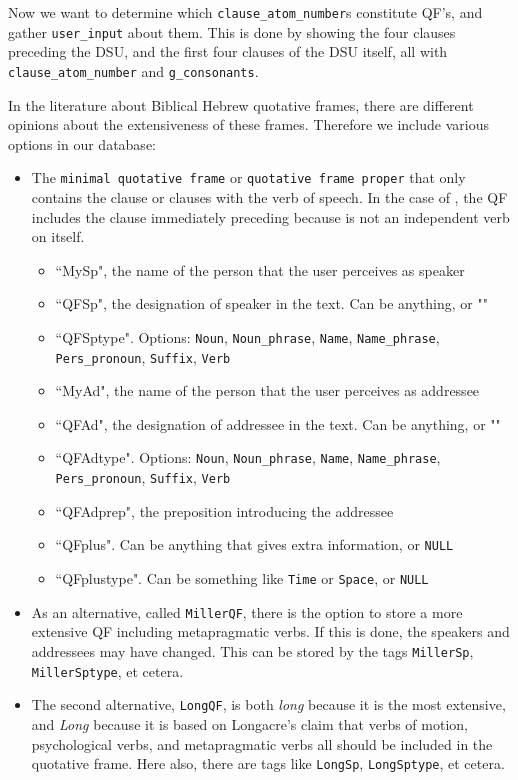 \documentclass{report}
\newcommand{\mi}[1]{\lstinline{#1}}
\begin{document}
\begin{multicols}{2}
Now we want to determine which \mi{clause_atom_number}s constitute QF's, and gather \mi{user_input} about them. This is done by showing the four clauses preceding the DSU, and the first four clauses of the DSU itself, all with \mi{clause_atom_number} and \mi{g_consonants}.

In the literature about Biblical Hebrew quotative frames, there are different opinions about the extensiveness of these frames. Therefore we include various options in our database:

\begin{itemize}
    \item The \mi{minimal quotative frame} or \mi{quotative frame proper} that only contains the clause or clauses with the verb of speech. In the case of , the QF includes the clause immediately preceding  because  is not an independent verb on itself.
    \begin{itemize}
        \item ``MySp", the name of the person that the user perceives as speaker 
        \item ``QFSp", the designation of speaker in the text. Can be anything, or ""
        \item ``QFSptype". Options: \mi{Noun}, \mi{Noun_phrase}, \mi{Name}, \mi{Name_phrase}, \mi{Pers_pronoun}, \mi{Suffix}, \mi{Verb}
        \item ``MyAd", the name of the person that the user perceives as addressee 
        \item ``QFAd", the designation of addressee in the text. Can be anything, or ""
        \item ``QFAdtype". Options: \mi{Noun}, \mi{Noun_phrase}, \mi{Name}, \mi{Name_phrase}, \mi{Pers_pronoun}, \mi{Suffix}, \mi{Verb}
        \item ``QFAdprep", the preposition introducing the addressee
        \item ``QFplus". Can be anything that gives extra information, or \mi{NULL}
        \item ``QFplustype". Can be something like \mi{Time} or \mi{Space}, or \mi{NULL}
    \end{itemize}
    \item As an alternative, called \mi{MillerQF}, there is the option to store a more extensive QF including metapragmatic verbs. If this is done, the speakers and addressees may have changed. This can be stored by the tags \mi{MillerSp}, \mi{MillerSptype}, et cetera. 
    \item The second alternative, \mi{LongQF}, is both \emph{long} because it is the most extensive, and \emph{Long} because it is based on Longacre's claim that verbs of motion, psychological verbs, and metapragmatic verbs all should be included in the quotative frame. Here also, there are tags like \mi{LongSp}, \mi{LongSptype}, et cetera.
\end{itemize}

\end{multicols}
\end{document}
